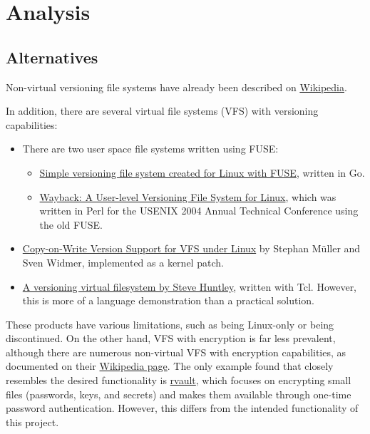 \chapter{Analysis}

\section{Alternatives}\label{sec:alternatives}

Non-virtual versioning file systems have already been described on \href{https://en.wikipedia.org/wiki/Versioning_file_system}{Wikipedia}.

In addition, there are several virtual file systems (VFS) with versioning capabilities:

\begin{itemize}
\item There are two user space file systems written using FUSE:
\begin{itemize}
\item \href{https://github.com/FooSoft/vfs}{Simple versioning file system created for Linux with FUSE}, written in Go.
\item \href{https://www.usenix.org/legacy/events/usenix04/tech/freenix/cornell.html}{Wayback: A User-level Versioning File System for Linux}, which was written in Perl for the USENIX 2004 Annual Technical Conference using the old FUSE\@.
\end{itemize}
\item \href{https://osm.hpi.de/vvfs/}{Copy-on-Write Version Support for VFS under Linux} by Stephan Müller and Sven Widmer, implemented as a kernel patch.
\item \href{https://wiki.tcl-lang.org/page/A+versioning+virtual+filesystem}{A versioning virtual filesystem by Steve Huntley}, written with Tcl.
However, this is more of a language demonstration than a practical solution.
\end{itemize}

These products have various limitations, such as being Linux-only or being discontinued.
On the other hand, VFS with encryption is far less prevalent, although there are numerous non-virtual VFS with encryption capabilities, as documented on their \href{https://en.wikipedia.org/wiki/Encrypting_File_System}{Wikipedia page}.
The only example found that closely resembles the desired functionality is \href{https://github.com/rmind/rvault}{rvault}, which focuses on encrypting small files (passwords, keys, and secrets) and makes them available through one-time password authentication.
However, this differs from the intended functionality of this project.

